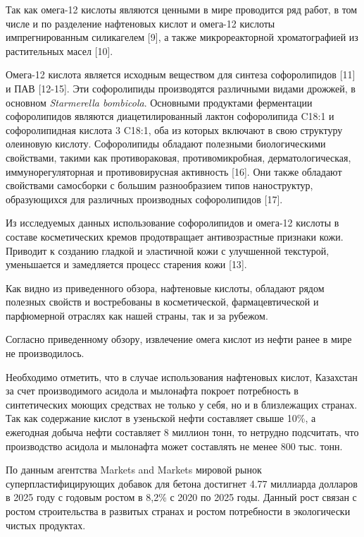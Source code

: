\begin{multicols}{2}
Так как омега-12 кислоты являются ценными в мире проводится ряд работ, в
том числе и по разделение нафтеновых кислот и омега-12 кислоты
импрегнированным силикагелем {[}9{]}, а также микрореакторной
хроматографией из растительных масел {[}10{]}.

Омега-12 кислота является исходным веществом для синтеза софоролипидов
{[}11{]} и ПАВ {[}12-15{]}. Эти софоролипиды производятся различными
видами дрожжей, в основном \emph{Starmerella bombicola}. Основными
продуктами ферментации софоролипидов являются диацетилированный лактон
софоролипида C18:1 и софоролипидная кислота 3 C18:1, оба из которых
включают в свою структуру олеиновую кислоту. Софоролипиды обладают
полезными биологическими свойствами, такими как противораковая,
противомикробная, дерматологическая, иммунорегуляторная и
противовирусная активность {[}16{]}. Они также обладают свойствами
самосборки с большим разнообразием типов наноструктур, образующихся для
различных производных софоролипидов {[}17{]}.

Из исследуемых данных использование софоролипидов и омега-12 кислоты в
составе косметических кремов продотвращает антивозрастные признаки кожи.
Приводит к созданию гладкой и эластичной кожи с улучшенной текстурой,
уменьшается и замедляется процесс старения кожи {[}13{]}.

Как видно из приведенного обзора, нафтеновые кислоты, обладают рядом
полезных свойств и востребованы в косметической, фармацевтической и
парфюмерной отраслях как нашей страны, так и за рубежом.

Согласно приведенному обзору, извлечение омега кислот из нефти ранее в
мире не производилось.

Необходимо отметить, что в случае использования нафтеновых кислот,
Казахстан за счет производимого асидола и мылонафта покроет потребность
в синтетических моющих средствах не только у себя, но и в близлежащих
странах. Так как содержание кислот в узеньской нефти составляет свыше
10\%, а ежегодная добыча нефти составляет 8 миллион тонн, то нетрудно
подсчитать, что производство асидола и мылонафта может составлять не
менее 800 тыс. тонн.

По данным агентства Markets and Markets мировой рынок
суперпластифицирующих добавок для бетона достигнет 4.77 миллиарда
долларов в 2025 году с годовым ростом в 8,2\% с 2020 по 2025 годы.
Данный рост связан с ростом строительства в развитых странах и ростом
потребности в экологически чистых продуктах.


\end{multicols}
